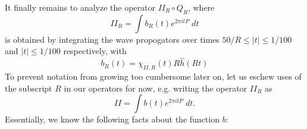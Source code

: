 It finally remains to analyze the operator $II_R \circ Q_R$, where
%
\[ II_R = \int b_R(t) e^{2 \pi i t P}\; dt \] %
%
is obtained by integrating the wave propogators over times $50/R \leq |t| \leq 1/100$ and $|t| \leq 1/100$ respectively, with
%
\[ b_R(t) = \chi_{II,R}(t) R \widehat{h}(Rt) \] %
%
%
%
%
%
To prevent notation from growing too cumbersome later on, let us eschew uses of the subscript $R$ in our operators for now, e.g. writing the operator $II_R$ as
%
\[ II = \int b(t) e^{2 \pi i t P}\; dt. \]
%
Essentially, we know the following facts about the function $b$:
%
